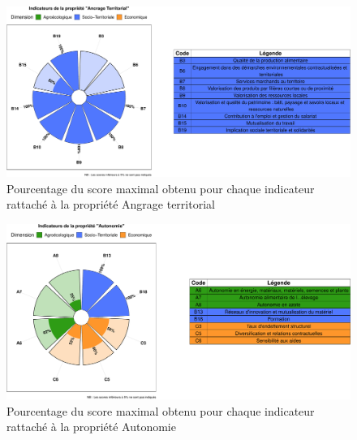 \documentclass[]{article}
\begin{document}
\begin{figure}[H]

{\centering \includegraphics[width=1\linewidth]{report_files/figure-latex/unnamed-chunk-17-1} 

}

\caption{Pourcentage du score maximal obtenu pour chaque indicateur rattaché à la propriété Angrage territorial}\label{fig:unnamed-chunk-17}
\end{figure}

\begin{figure}[H]

{\centering \includegraphics[width=1\linewidth]{report_files/figure-latex/unnamed-chunk-18-1} 

}

\caption{Pourcentage du score maximal obtenu pour chaque indicateur rattaché à la propriété Autonomie}\label{fig:unnamed-chunk-18}
\end{figure}
\end{document}
